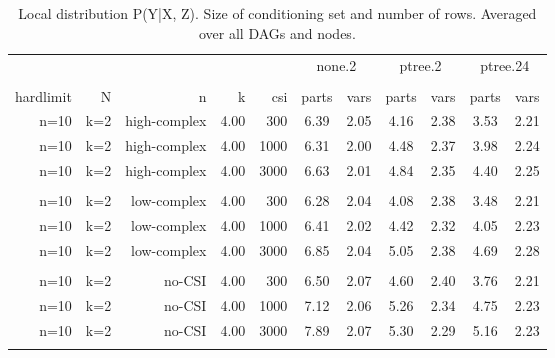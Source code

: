 \begin{table}[ht]
\centering
\caption{Local distribution P(Y|X, Z). Size of conditioning set and number of rows. Averaged over all DAGs and nodes.} 
\begin{tabular}{rrrrr|cc|cc|cc}
  \toprule
   & & & & &\multicolumn{2}{c}{none.2}&\multicolumn{2}{c}{ptree.2}&\multicolumn{2}{c}{ptree.24}   \\ 
 \cline{6-11}  \\ 
 hardlimit & N & n & k & csi & parts & vars & parts & vars & parts & vars  \\ 
 \midrule
n=10 & k=2 & high-complex & 4.00 & 300 & 6.39 & 2.05 & 4.16 & 2.38 & 3.53 & 2.21 \\ 
  n=10 & k=2 & high-complex & 4.00 & 1000 & 6.31 & 2.00 & 4.48 & 2.37 & 3.98 & 2.24 \\ 
  n=10 & k=2 & high-complex & 4.00 & 3000 & 6.63 & 2.01 & 4.84 & 2.35 & 4.40 & 2.25 \\ 
   \\ 
n=10 & k=2 & low-complex & 4.00 & 300 & 6.28 & 2.04 & 4.08 & 2.38 & 3.48 & 2.21 \\ 
  n=10 & k=2 & low-complex & 4.00 & 1000 & 6.41 & 2.02 & 4.42 & 2.32 & 4.05 & 2.23 \\ 
  n=10 & k=2 & low-complex & 4.00 & 3000 & 6.85 & 2.04 & 5.05 & 2.38 & 4.69 & 2.28 \\ 
   \\ 
n=10 & k=2 & no-CSI & 4.00 & 300 & 6.50 & 2.07 & 4.60 & 2.40 & 3.76 & 2.21 \\ 
  n=10 & k=2 & no-CSI & 4.00 & 1000 & 7.12 & 2.06 & 5.26 & 2.34 & 4.75 & 2.23 \\ 
  n=10 & k=2 & no-CSI & 4.00 & 3000 & 7.89 & 2.07 & 5.30 & 2.29 & 5.16 & 2.23 \\ 
   \bottomrule 
 \multicolumn{11}{l}{\scriptsize } 
 \end{tabular}
\end{table}
